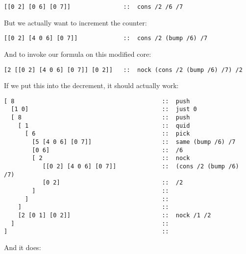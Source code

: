 \begin{framed_shaded}
\begin{Verbatim}[fontsize=\relsize{-2.5},commandchars=\\\{\}]
[[0 2] [0 6] [0 7]]               ::  cons /2 /6 /7
\end{Verbatim}
\end{framed_shaded}
But we actually want to increment the counter:

\begin{framed_shaded}
\begin{Verbatim}[fontsize=\relsize{-2.5},commandchars=\\\{\}]
[[0 2] [4 0 6] [0 7]]             ::  cons /2 (bump /6) /7
\end{Verbatim}
\end{framed_shaded}
And to invoke our formula on this modified core:

\begin{framed_shaded}
\begin{Verbatim}[fontsize=\relsize{-2.5},commandchars=\\\{\}]
[2 [[0 2] [4 0 6] [0 7]] [0 2]]   ::  nock (cons /2 (bump /6) /7) /2
\end{Verbatim}
\end{framed_shaded}
If we put this into the decrement, it should actually work:

\begin{framed_shaded}
\begin{Verbatim}[fontsize=\relsize{-2.5},commandchars=\\\{\}]
[ 8                                          ::  push
  [1 0]                                      ::  just 0
  [ 8                                        ::  push
    [ 1                                      ::  quid
      [ 6                                    ::  pick
        [5 [4 0 6] [0 7]]                    ::  same (bump /6) /7
        [0 6]                                ::  /6
        [ 2                                  ::  nock
           [[0 2] [4 0 6] [0 7]]             ::  (cons /2 (bump /6) /7)
           [0 2]                             ::  /2
        ]                                    ::
      ]                                      ::
    ]                                        ::
    [2 [0 1] [0 2]]                          ::  nock /1 /2
  ]                                          ::
]                                            ::
\end{Verbatim}
\end{framed_shaded}
And it does:

